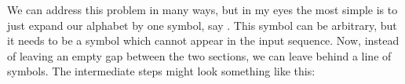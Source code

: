 We can address this problem in many ways, but in my eyes the most simple is to just expand our alphabet by one symbol, say . This symbol can be arbitrary, but it needs to be a symbol which cannot appear in the input sequence. Now, instead of leaving an empty gap between the two sections, we can leave behind a line of  symbols. The intermediate steps might look something like this:

\begin{center}
\end{center}
